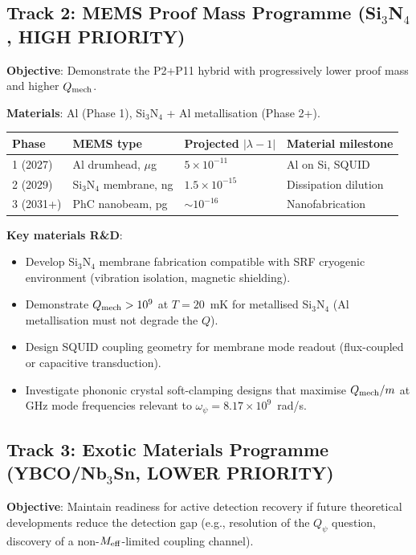 \documentclass[11pt]{article}
\theoremstyle{definition}
\theoremstyle{remark}
\newcommand{\ee}[1]{\times 10^{#1}}
\newcommand{\Meff}{M_{\rm eff}}
\newcommand{\Opsi}{\omega_\psi}
\newcommand{\Qpsi}{Q_\psi}
\newcommand{\lam}{|\lambda-1|}
\begin{document}
\subsection{Track 2: MEMS Proof Mass Programme (Si$_3$N$_4$, HIGH PRIORITY)}

\textbf{Objective}: Demonstrate the P2+P11 hybrid with progressively
lower proof mass and higher $Q_{\rm mech}$.

\textbf{Materials}: Al (Phase 1), Si$_3$N$_4$ + Al metallisation (Phase 2+).

\begin{center}
\renewcommand{\arraystretch}{1.3}
\begin{tabular}{p{2cm}p{3cm}p{2.5cm}p{3cm}}
\toprule
Phase & MEMS type & Projected $\lam$ & Material milestone \\
\midrule
1 (2027) & Al drumhead, $\mu$g & $5\ee{-11}$ & Al on Si, SQUID \\
2 (2029) & Si$_3$N$_4$ membrane, ng & $1.5\ee{-15}$ & Dissipation dilution \\
3 (2031+) & PhC nanobeam, pg & $\sim 10^{-16}$ & Nanofabrication \\
\bottomrule
\end{tabular}
\end{center}

\textbf{Key materials R\&D}:
\begin{itemize}[nosep]
  \item Develop Si$_3$N$_4$ membrane fabrication compatible with SRF
    cryogenic environment (vibration isolation, magnetic shielding).
  \item Demonstrate $Q_{\rm mech} > 10^9$ at $T = 20$~mK for metallised
    Si$_3$N$_4$ (Al metallisation must not degrade the $Q$).
  \item Design SQUID coupling geometry for membrane mode readout
    (flux-coupled or capacitive transduction).
  \item Investigate phononic crystal soft-clamping designs that
    maximise $Q_{\rm mech}/m$ at GHz mode frequencies relevant to
    $\Opsi = 8.17\ee{9}$~rad/s.
\end{itemize}

\subsection{Track 3: Exotic Materials Programme (YBCO/Nb$_3$Sn, LOWER PRIORITY)}

\textbf{Objective}: Maintain readiness for active detection recovery
if future theoretical developments reduce the detection gap (e.g.,
resolution of the $\Qpsi$ question, discovery of a non-$\Meff$-limited
coupling channel).
\end{document}

